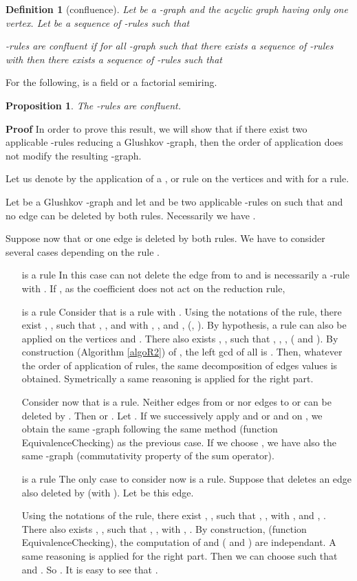 \documentclass[11pt]{article}
\newtheorem{proposition}[theorem]{Proposition}
\newtheorem{definition}[theorem]{Definition}
\begin{document}
\begin{definition}[confluence]
Let  be a -graph and  the acyclic graph having only one vertex. Let  be a sequence of -rules such that 


-rules are confluent if for all -graph
  such that there exists   a sequence of -rules with   then there exists  a sequence of -rules such that  
\end{definition}
For the following,  is a field or a factorial semiring.
\begin{proposition}\label{confluent}
The -rules are confluent.
\end{proposition}
{\bf Proof } In order to prove this result, we will show that if there exist two applicable -rules reducing a Glushkov -graph, then the order of application does not modify the resulting -graph. 

Let us denote by  the application of a ,  or  rule on the vertices  and  with  for a  rule.

Let  be a Glushkov -graph and let  and  be two applicable -rules on  such that   and no edge can be deleted by both rules. Necessarily we have  .

Suppose now that  or one edge is deleted by both rules. We have to consider several cases depending on the rule .
\begin{itemize}
\item[ is a  rule] In this case  can not delete the edge from  to  and  is necessarily a -rule with . If , as the coefficient does not act on the reduction rule, 

\item[ is a  rule] Consider that  is a  rule with . Using the notations of the  rule, there exist , ,  such that , ,  and   with , , and ,  (, ). By hypothesis, a  rule can also be applied on the vertices  and . There also exists , ,  such that , , ,   ( and ). By construction (Algorithm \ref{algoR2}) 
of , the left gcd of all  is . Then, whatever  the order of application of  rules,  the same decomposition of edges values is obtained. Symetrically a same reasoning is applied for the right part. 


Consider now that  is a  rule. Neither edges from  or  nor edges to  or  can be deleted by . Then  or . Let . If we successively apply  and   or  and  on , we obtain the same -graph following the same method (function {\sc EquivalenceChecking})
 as the previous case. If we choose , we have also the same -graph (commutativity property of the sum operator). 
\item[ is a  rule] The only case to consider now is  a  rule. Suppose that  deletes an edge also deleted by  (with ). Let  be this edge.


Using the notations of the  rule, there exist , ,  such that , ,  with ,  and , .
 There also exists , ,  such that , ,  with , . By construction, (function {\sc EquivalenceChecking}),
  the computation of   and  ( and ) are independant.  A same reasoning is applied for the right part. Then we can choose  such that  and . So 
. It is easy to see that .
\end{itemize}
\cqfd
\end{document}
